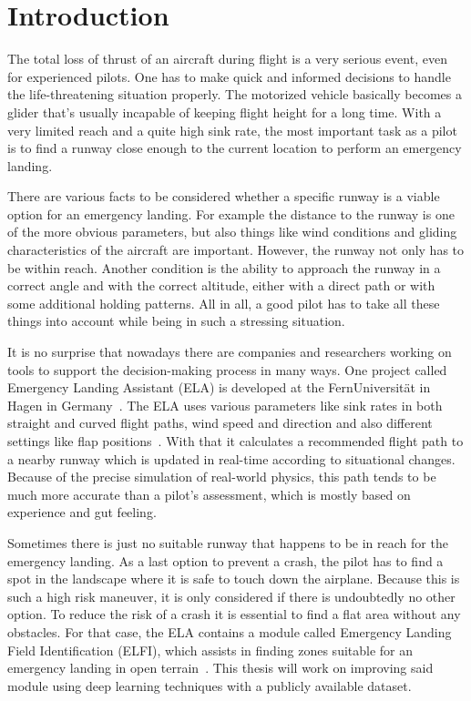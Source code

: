\section{Introduction}
The total loss of thrust of an aircraft during flight is a very serious event, even for experienced pilots. One has to make quick and informed decisions to handle the life-threatening situation properly. The motorized vehicle basically becomes a glider that's usually incapable of keeping flight height for a long time. With a very limited reach and a quite high sink rate, the most important task as a pilot is to find a runway close enough to the current location to perform an emergency landing.

There are various facts to be considered whether a specific runway is a viable option for an emergency landing. For example the distance to the runway is one of the more obvious parameters, but also things like wind conditions and gliding characteristics of the aircraft are important. However, the runway not only has to be within reach. Another condition is the ability to approach the runway in a correct angle and with the correct altitude, either with a direct path or with some additional holding patterns. All in all, a good pilot has to take all these things into account while being in such a stressing situation.

It is no surprise that nowadays there are companies and researchers working on tools to support the decision-making process in many ways. One project called Emergency Landing Assistant (ELA) is developed at the FernUniversität in Hagen in Germany~\cite{feu_fas}. The ELA uses various parameters like sink rates in both straight and curved flight paths, wind speed and direction and also different settings like flap positions~\cite{glide_path20}. With that it calculates a recommended flight path to a nearby runway which is updated in real-time according to situational changes. Because of the precise simulation of real-world physics, this path tends to be much more accurate than a pilot's assessment, which is mostly based on experience and gut feeling.

Sometimes there is just no suitable runway that happens to be in reach for the emergency landing. As a last option to prevent a crash, the pilot has to find a spot in the landscape where it is safe to touch down the airplane. Because this is such a high risk maneuver, it is only considered if there is undoubtedly no other option. To reduce the risk of a crash it is essential to find a flat area without any obstacles. For that case, the ELA contains a module called Emergency Landing Field Identification (ELFI), which assists in finding zones suitable for an emergency landing in open terrain~\cite{feu_elfi}. This thesis will work on improving said module using deep learning techniques with a publicly available dataset.

